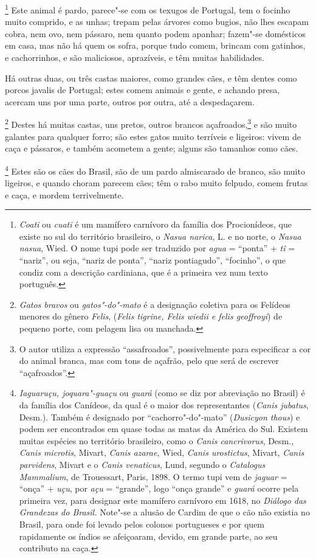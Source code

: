 \footnote{ \textit{Coati} ou \textit{cuati} é
um mamífero carnívoro da família dos Procionídeos, que existe no sul do
território brasileiro, o \textit{Nasua narica}, L. e no norte, o
\textit{Nasua nasua}, Wied. O nome tupi pode ser traduzido por
\textit{agua} = ``ponta'' + \textit{tî} = ``nariz'', ou seja, ``nariz de
ponta'', ``nariz pontiagudo'', ``focinho'', o que condiz com a descrição
cardiniana, que é a primeira vez num texto português.} Este animal
é pardo, parece"-se com os texugos de Portugal, tem o focinho muito
comprido, e as unhas; trepam pelas árvores como bugios, não lhes
escapam cobra, nem ovo, nem pássaro, nem quanto podem apanhar; fazem"-se
domésticos em casa, mas não há quem os sofra, porque tudo comem, brincam
com gatinhos, e cachorrinhos, e são maliciosos, aprazíveis, e têm
muitas habilidades.

 Há outras duas, ou três castas maiores, como grandes cães, e têm dentes
como porcos javalis de Portugal; estes comem animais e gente, e achando
presa, acercam uns por uma parte, outros por outra, até a despedaçarem.

\footnote{ \textit{Gatos bravos} ou
\textit{gatos"-do"-mato} é a designação coletiva para os Felídeos
menores do gênero \textit{Felis}, (\textit{Felis tigrine, Felis wiedii e felis
geoffroyi}) de pequeno porte, com pelagem lisa ou manchada.} 
Destes há muitas castas, uns pretos, outros brancos açafroados,\footnote{ O autor utiliza a expressão ``assafroados'', 
possivelmente para especificar a cor do animal branca, mas com tons de
açafrão, pelo que será de escrever ``açafroados''.} e são muito
galantes para qualquer forro; são estes gatos muito terríveis e
ligeiros: vivem de caça e pássaros, e também acometem a gente; alguns
são tamanhos como cães. 

\footnote{ \textit{Iaguaruçu, joquara"-guaçu} ou 
\textit{guará} (como se diz por abreviação no Brasil) é da
família dos Canídeos, da qual é o maior dos representantes (\textit{Canis jubatus}, Desm.). Também é designado por
``cachorro"-do"-mato'' (\textit{Dusicyon thous}) e podem ser encontrados
em quase todas as matas da América do Sul. Existem muitas espécies no
território brasileiro, como o \textit{Canis cancrivorus}, Desm.,
\textit{Canis microtis}, Mivart, \textit{Canis azarae}, Wied,
\textit{Canis urostictus}, Mivart, \textit{Canis parvidens}, Mivart e o
\textit{Canis venaticus}, Lund, segundo o \textit{Catalogus Mammalium}, de Trouessart, Paris, 1898. O termo tupi vem de \textit{jaguar} = 
``onça'' + \textit{uçu}, por \textit{açu} = ``grande'', logo ``onça grande'' 
e \textit{guará} ocorre pela primeira vez, para designar
este mamífero carnívoro em 1618, no \textit{Diálogo das Grandezas do
Brasil.} Note"-se a alusão de Cardim de que o cão não existia no Brasil,
para onde foi levado pelos colonos portugueses e por quem rapidamente
os índios se afeiçoaram, devido, em grande parte, ao seu contributo na
caça.} Estes são os cães do Brasil, são de um pardo
almiscarado de branco, são muito ligeiros, e quando choram parecem cães;
têm o rabo muito felpudo, comem frutas e caça, e mordem terrivelmente.

